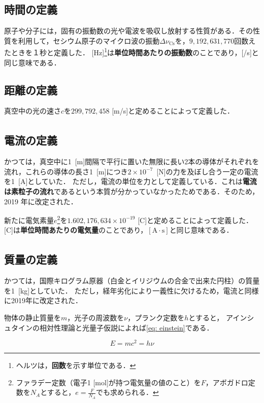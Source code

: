 \documentclass[a4paper,11pt]{ltjsarticle}
\numberwithin{equation}{section}
\renewcommand{\cite}[1]{\textsuperscript{\citep{#1}}}
\begin{document}
\subsection*{時間の定義\cite{units-2}}

原子や分子には，固有の振動数の光や電波を吸収し放射する性質がある．その性質を利用して，セシウム原子のマイクロ波の振動$\Delta \nu_{\mathrm{Cs}}$を，$9,192,631,770$回数えたときを１秒と定義した．
[Hz]\footnote{ヘルツは，\textbf{回数}を示す単位である．}は\textbf{単位時間あたりの振動数}のことであり，[/s]と同じ意味である．

\subsection*{距離の定義}

真空中の光の速さ$c$を$299,792,458$ [m/s]と定めることによって定義した．

\subsection*{電流の定義\cite{units-5}}

かつては，真空中に1\ [m]間隔で平行に置いた無限に長い2本の導体がそれぞれを流れ，これらの導体の長さ1\ [m]につき$2 \times 10^{-7}$\ [N]の力を及ぼし合う一定の電流を1\ [A]としていた．
ただし，電流の単位を力として定義している．これは\textbf{電流は素粒子の流れ}であるという本質が分かっていなかったためである．そのため，2019 年に改定された．

新たに電気素量$e$\footnote{ファラデー定数（電子1 [mol]が持つ電気量の値のこと）を$F$，アボガドロ定数を$N_A$とすると，$e=\tfrac{F}{N_A}$でも求められる．}を$1.602,176,634 \times 10^{−19}$ [C]と定めることによって定義した．
[C]は\textbf{単位時間あたりの電気量}のことであり，$\mathrm{[A \cdot s]}$と同じ意味である．

\subsection*{質量の定義\cite{units-3}}

かつては，国際キログラム原器（白金とイリジウムの合金で出来た円柱）の質量を1\ [kg]としていた．
ただし，経年劣化により一義性に欠けるため，電流と同様に2019年に改定された．
  
物体の静止質量を$m$，光子の周波数を$\nu$，プランク定数を$h$とすると，
アインシュタインの相対性理論と光量子仮説によれば\cref{eq: einstein}である．

  \begin{equation}
    E = mc^2 = h \nu \label{eq: einstein}
  \end{equation}
\end{document}
